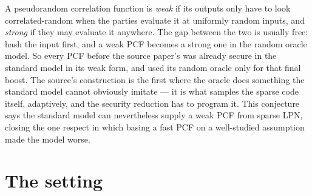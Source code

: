\documentclass{conjura-conjecture}
\begin{document}

\vspace{0.4em}

\begin{informalconjecture}
A pseudorandom correlation function is \emph{weak} if its outputs only
have to look correlated-random when the parties evaluate it at uniformly
random inputs, and \emph{strong} if they may evaluate it anywhere. The
gap between the two is usually free: hash the input first, and a weak
PCF becomes a strong one in the random oracle model. So every PCF before
the source paper's was already secure in the standard model in its weak
form, and used its random oracle only for that final boost. The source's
construction is the first where the oracle does something the standard
model cannot obviously imitate --- it is what samples the sparse code
itself, adaptively, and the security reduction has to program it. This
conjecture says the standard model can nevertheless supply a weak PCF
from sparse LPN, closing the one respect in which basing a fast PCF on a
well-studied assumption made the model worse.
\end{informalconjecture}

\section{The setting}\label{sec:setting}
\end{document}
